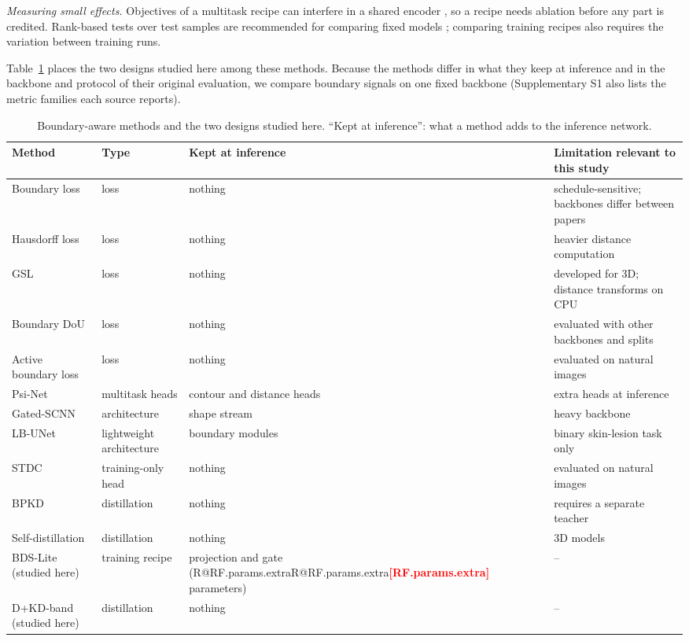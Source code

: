 \documentclass[fleqn,10pt,lineno]{wlpeerj}
\makeatletter
\newcommand{\R}[1]{\ifcsname R@#1\endcsname\csname R@#1\endcsname\else\textbf{\textcolor{red}{[#1]}}\fi}
\makeatother
\begin{document}
\emph{Measuring small effects.} Objectives of a multitask recipe can interfere in a shared encoder \citep{Yu2020PCGrad}, so a recipe needs ablation before any part is credited. Rank-based tests over test samples are recommended for comparing fixed models \citep{Demsar2006Statistical}; comparing training recipes also requires the variation between training runs.

Table~\ref{tab:related} places the two designs studied here among these methods. Because the methods differ in what they keep at inference and in the backbone and protocol of their original evaluation, we compare boundary signals on one fixed backbone (Supplementary S1 also lists the metric families each source reports).

\begin{table}[!tb]
\centering
\footnotesize\setlength{\tabcolsep}{3pt}
\begin{tabularx}{\textwidth}{@{}>{\raggedright\arraybackslash}p{3.5cm}>{\raggedright\arraybackslash}p{1.9cm}>{\raggedright\arraybackslash}p{2.6cm}>{\raggedright\arraybackslash}X@{}}
\toprule
Method & Type & Kept at inference & Limitation relevant to this study \\
\midrule
Boundary loss \citep{Kervadec2019Boundary} & loss & nothing & schedule-sensitive; backbones differ between papers \\
Hausdorff loss \citep{Karimi2020Reducing} & loss & nothing & heavier distance computation \\
GSL \citep{Celaya2024A} & loss & nothing & developed for 3D; distance transforms on CPU \\
Boundary DoU \citep{Sun2023Boundary} & loss & nothing & evaluated with other backbones and splits \\
Active boundary loss \citep{Wang2022Active} & loss & nothing & evaluated on natural images \\
Psi-Net \citep{Murugesan2019PsiNet} & multitask heads & contour and distance heads & extra heads at inference \\
Gated-SCNN \citep{Takikawa2019GatedSCNN} & architecture & shape stream & heavy backbone \\
LB-UNet \citep{Xu2024LBUNet} & lightweight architecture & boundary modules & binary skin-lesion task only \\
STDC \citep{Fan2021STDC} & training-only head & nothing & evaluated on natural images \\
BPKD \citep{Liu2024BPKD} & distillation & nothing & requires a separate teacher \\
Self-distillation \citep{Wang2023MISSU, Banerjee2024Dual} & distillation & nothing & 3D models \\
\midrule
BDS-Lite (studied here) & training recipe & projection and gate (\R{RF.params.extra} parameters) & -- \\
D+KD-band (studied here) & distillation & nothing & -- \\
\bottomrule
\end{tabularx}
\caption{\label{tab:related}Boundary-aware methods and the two designs studied here. ``Kept at inference'': what a method adds to the inference network.}
\end{table}
\end{document}

